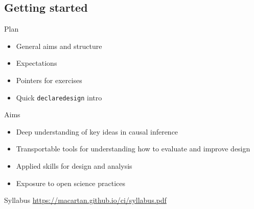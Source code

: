 \documentclass[
  11pt,
  ignorenonframetext,
]{beamer}
\providecommand{\tightlist}{%
  \setlength{\itemsep}{0pt}\setlength{\parskip}{0pt}}\usepackage{longtable,booktabs,array}
\begin{document}
\hypertarget{getting-started}{%
\subsection{Getting started}\label{getting-started}}

\begin{frame}[fragile]{Plan}
\protect\hypertarget{plan}{}
\begin{itemize}
\tightlist
\item
  General aims and structure
\item
  Expectations
\item
  Pointers for exercises
\item
  Quick \texttt{declaredesign} intro
\end{itemize}
\end{frame}

\begin{frame}{Aims}
\protect\hypertarget{aims}{}
\begin{itemize}
\tightlist
\item
  Deep understanding of key ideas in causal inference
\item
  Transportable tools for understanding how to evaluate and improve
  design
\item
  Applied skills for design and analysis
\item
  Exposure to open science practices
\end{itemize}
\end{frame}

\begin{frame}{Syllabus}
\protect\hypertarget{syllabus}{}
\url{https://macartan.github.io/ci/syllabus.pdf}
\end{frame}
\end{document}
